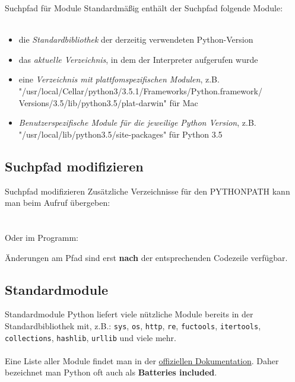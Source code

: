 \begin{frame}{Suchpfad f\"ur Module}
	Standardm\"a\ss{}ig enth\"alt der Suchpfad folgende Module: \\ \ \\
	\begin{itemize}
		\item die \textit{Standardbibliothek} der derzeitig verwendeten Python-Version
		\item das \textit{aktuelle Verzeichnis}, in dem der Interpreter aufgerufen wurde
		\item eine \textit{Verzeichnis mit plattfomspezifischen Modulen}, z.B.
			"/usr/local/Cellar/python3/3.5.1/Frameworks/Python.framework/
			Versions/3.5/lib/python3.5/plat-darwin" f\"ur Mac
		\item \textit{Benutzerspezifische Module f\"ur die jeweilige Python Version}, z.B. "/usr/local/lib/python3.5/site-packages" f\"ur Python 3.5
	\end{itemize}
\end{frame}



\subsection{Suchpfad modifizieren}
\begin{frame}{Suchpfad modifizieren}
	Zus\"atzliche Verzeichnisse f\"ur den PYTHONPATH kann man beim Aufruf \"ubergeben:\\
	\hspace*{.5cm}\\ \ \\
	Oder im Programm:
	
	\"Anderungen am Pfad sind erst \textbf{nach} der entsprechenden Codezeile verf\"ugbar.
\end{frame}



\subsection{Standardmodule}
\begin{frame}{Standardmodule}
	Python liefert viele n\"utzliche Module bereits in der Standardbibliothek mit, z.B.:
	\texttt{sys}, \texttt{os}, \texttt{http}, \texttt{re}, \texttt{fuctools}, \texttt{itertools}, \texttt{collections}, \texttt{hashlib}, \texttt{urllib} und viele mehr. \\ \ \\
	Eine Liste aller Module findet man in der \href{https://docs.python.org/3/library/index.html}{offiziellen Dokumentation}.
	Daher bezeichnet man Python oft auch als \textbf{Batteries included}.
\end{frame}

